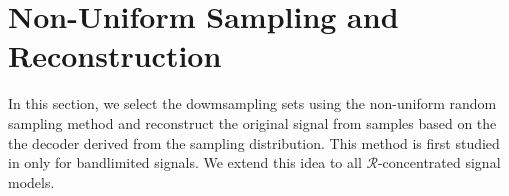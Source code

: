 \documentclass[a4paper]{article}
\newcommand{\R}{\mathcal{R}}
\theoremstyle{definition}
\begin{document}

\section{Non-Uniform Sampling and Reconstruction}


In this section, we select the dowmsampling sets using the non-uniform random sampling method and reconstruct the original signal from samples based on the the decoder derived from the sampling distribution. This method is first studied in \cite{random sampling} only for bandlimited signals. We extend this idea to all $\R$-concentrated signal models.
\end{document}
